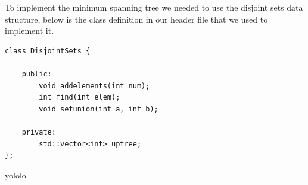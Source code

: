 \documentclass[titlepage]{article}
\begin{document}
\noindent
To implement the minimum spanning tree we needed to use the disjoint sets data structure, below is the class definition in our header file that we used to implement it.

\begin{lstlisting}
class DisjointSets {

	public:
		void addelements(int num);
		int find(int elem);
		void setunion(int a, int b);

	private:
		std::vector<int> uptree;
};
\end{lstlisting}

\newpage

\noindent
yololo
\end{document}
